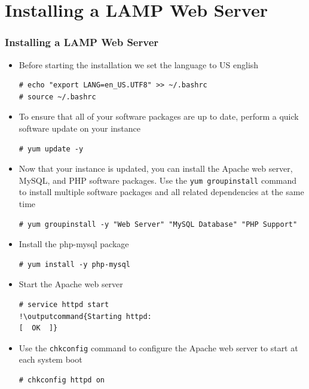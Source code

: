 \documentclass{beamer}
\newcommand{\outputcommand}[1]{\color{darkgreen}{#1}}
\begin{document}
\section{Installing a LAMP Web Server}
\begin{frame}
\frametitle{Installing a LAMP Web Server}
\begin{itemize}
\item Before starting the installation we set the language to US english
\lstset{language=shell, escapechar=!}
\begin{lstlisting}[escapechar=!]
# echo "export LANG=en_US.UTF8" >> ~/.bashrc
# source ~/.bashrc
\end{lstlisting}

\item To ensure that all of your software packages are up to date, perform a quick software update on your instance
\lstset{language=shell, escapechar=!}
\begin{lstlisting}[escapechar=!]
# yum update -y
\end{lstlisting}

\item Now that your instance is updated, you can install the Apache web server, MySQL, and PHP software packages. Use the \texttt{yum groupinstall} command to install multiple software packages and all related dependencies at the same time
\lstset{language=shell}
\begin{lstlisting}[escapechar=!]
# yum groupinstall -y "Web Server" "MySQL Database" "PHP Support"
\end{lstlisting}

\item Install the php-mysql package
\lstset{language=shell}
\begin{lstlisting}[escapechar=!]
# yum install -y php-mysql
\end{lstlisting}

\item Start the Apache web server

\lstset{language=shell}
\begin{lstlisting}[escapechar=!]
# service httpd start
!\outputcommand{Starting httpd:                                            [  OK  ]}
\end{lstlisting}

\item Use the \texttt{chkconfig} command to configure the Apache web server to start at each system boot
\lstset{language=shell}
\begin{lstlisting}[escapechar=!]
# chkconfig httpd on
\end{lstlisting}


\end{itemize}
\end{frame}
\end{document}
